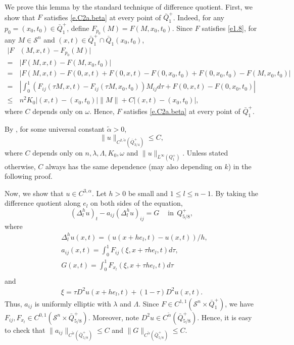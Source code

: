 \documentclass[preprint,12pt]{elsarticle}
\theoremstyle{definition}
\theoremstyle{remark}
\numberwithin{equation}{section}
\begin{document}
\proof We prove this lemma by the standard technique of difference quotient. First, we show that $F$  satisfies \cref{e.C2a.beta} at every point of $\bar{Q}_1^+$. Indeed, for any $p_0=(x_0,t_0)\in \bar{Q}_1^+$, define $F_{p_0}(M)=F(M,x_0,t_0)$. Since $F$ satisfies \cref{e1.8}, for any $M\in \mathcal{S}^{n}$ and $(x,t)\in \bar{Q}_1^+\cap \bar Q_{1}(x_0,t_0)$,
\begin{equation*}
  \begin{aligned}
|F&(M,x,t)-F_{p_0}(M)|\\
=&|F(M,x,t)-F(M,x_0,t_0)|\\
= &|F(M,x,t)-F(0,x,t)+F(0,x,t)-F(0,x_0,t_0)+F(0,x_0,t_0)-F(M,x_0,t_0)|\\
=&\left|\int_{0}^{1}\left(F_{ij}(\tau M,x,t)-F_{ij}(\tau M,x_0,t_0)\right)M_{ij}d\tau+F(0,x,t)-F(0,x_0,t_0)\right|\\
\leq&n^2K_0|(x,t)-(x_0,t_0)|\|M\|+C|(x,t)-(x_0,t_0)|,
  \end{aligned}
\end{equation*}
where $C$ depends only on $\omega$. Hence, $F$ satisfies \cref{e.C2a.beta} at every point of $\bar{Q}_1^+$.

By , for some universal constant $\tilde{\alpha}>0$,
\begin{equation*}
\|u\|_{C^{2,\tilde\alpha}(\bar{Q}_{3/4}^+)}\leq C,
\end{equation*}
where $C$ depends only on $n,\lambda, \Lambda,K_0,\omega$ and $\|u\|_{L^{\infty }(Q_1^+)}$. Unless stated otherwise, $C$ always has the same dependence (may also depending on $k$) in the following proof.

Now, we show that $u\in C^{3,\alpha}$. Let $h>0$ be small and $1\leq l\leq n-1$. By taking the difference quotient along $e_l$ on both sides of the equation,
\begin{equation*}
  (\Delta_l^h u)_{t}-a_{ij}(\Delta_l^h u)_{ij}=G ~~~~\mbox{ in}~~ Q^+_{5/8},
\end{equation*}
where
\begin{equation*}
  \begin{aligned}
&\Delta_l^h u(x,t)=\left(u(x+he_l,t)-u(x,t)\right)/h,\\
&a_{ij}(x,t)=\int_{0}^{1}F_{ij}(\xi,x+\tau h e_l,t)d \tau,\\
&G(x,t)=\int_{0}^{1}F_{x_l}(\xi,x+\tau h e_l,t)d \tau \\
  \end{aligned}
\end{equation*}
and
\begin{equation*}
  \begin{aligned}
\xi=\tau D^2u(x+he_l,t)+(1-\tau)D^2u(x,t).
  \end{aligned}
\end{equation*}
Thus, $a_{ij}$ is uniformly elliptic with $\lambda$ and $\Lambda$. Since $F\in C^{1,1}(\mathcal{S}^{n}\times \bar Q^+_1)$, we have $F_{ij},F_{x_l}\in C^{0,1}(\mathcal{S}^{n}\times \bar Q^+_{5/8})$. Moreover, note $D^2 u \in C^{\tilde \alpha}(\bar Q^+_{5/8})$. Hence, it is easy to check that $\|a_{ij}\|_{C^{\tilde \alpha}(\bar{Q}^+_{5/8})}\leq C$ and $\|G\|_{C^{\tilde \alpha}(\bar{Q}^+_{5/8})}\leq C$.
\end{document}
